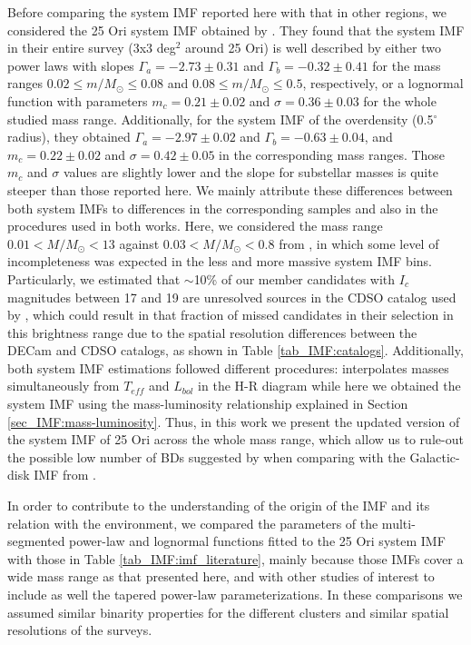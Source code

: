 \documentclass[12pt]{article}
\newcounter{subsubsubsection}[subsubsection]
\begin{document}
\label{sec_IMF:imf_comparison}
Before comparing the system IMF reported here with that in other regions, we considered the 25 Ori system IMF obtained by \citet{Downes2014}. They found that the system IMF in their entire survey (3x3 deg$^2$ around 25 Ori) is well described by either two power laws with slopes $\Gamma_a=-2.73\pm0.31$ and $\Gamma_b=-0.32\pm0.41$ for the mass ranges $0.02\le m/M_\odot\le0.08$ and $0.08\le m/M_\odot\le0.5$, respectively, or a lognormal function with parameters $m_c=0.21\pm0.02$ and $\sigma=0.36\pm0.03$ for the whole studied mass range. Additionally, for the system IMF of the overdensity (0.5$^\circ$ radius), they obtained $\Gamma_a=-2.97\pm0.02$ and $\Gamma_b=-0.63\pm0.04$, and $m_c=0.22\pm0.02$ and $\sigma=0.42\pm0.05$ in the corresponding mass ranges. Those $m_c$ and $\sigma$ values are slightly lower and the slope for substellar masses is quite steeper than those reported here. We mainly attribute these differences between both system IMFs to differences in the corresponding samples and also in the procedures used in both works. Here, we considered the mass range $0.01<M/M_\odot<13$ against $0.03<M/M_\odot<0.8$ from \citet{Downes2014}, in which some level of incompleteness was expected in the less and more massive system IMF bins. Particularly, we estimated that $\sim$10\% of our member candidates with $I_c$ magnitudes between 17 and 19 are unresolved sources in the CDSO catalog used by \citet{Downes2014}, which could result in that fraction of missed candidates in their selection in this brightness range due to the spatial resolution differences between the DECam and CDSO catalogs, as shown in Table \ref{tab_IMF:catalogs}. Additionally, both system IMF estimations followed different procedures: \citet{Downes2014} interpolates masses simultaneously from $T_{eff}$ and $L_{bol}$ in the H-R diagram while here we obtained the system IMF using the mass-luminosity relationship explained in Section \ref{sec_IMF:mass-luminosity}. Thus, in this work we present the updated version of the system IMF of 25 Ori across the whole mass range, which allow us to rule-out the possible low number of BDs suggested by \citet{Downes2014} when comparing with the Galactic-disk IMF from \citet{Chabrier2003b}.

In order to contribute to the understanding of the origin of the IMF and its relation with the environment, we compared the parameters of the multi-segmented power-law and lognormal functions fitted to the 25 Ori system IMF with those in Table \ref{tab_IMF:imf_literature}, mainly because those IMFs cover a wide mass range as that presented here, and with other studies of interest to include as well the tapered power-law parameterizations. In these comparisons we assumed similar binarity properties for the different clusters and similar spatial resolutions of the surveys.
\end{document}
